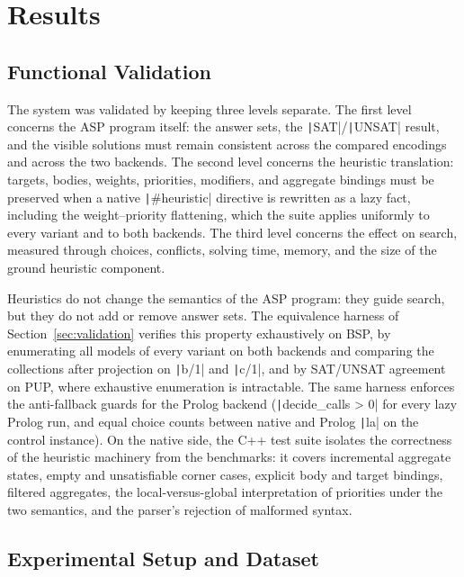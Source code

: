 \section{Results}
\label{sec:results}

\subsection{Functional Validation}

The system was validated by keeping three levels separate. The first level concerns the ASP program itself: the answer sets, the \texttt|SAT|/\texttt|UNSAT| result, and the visible solutions must remain consistent across the compared encodings and across the two backends. The second level concerns the heuristic translation: targets, bodies, weights, priorities, modifiers, and aggregate bindings must be preserved when a native \texttt|#heuristic| directive is rewritten as a lazy fact, including the weight--priority flattening, which the suite applies uniformly to every variant and to both backends. The third level concerns the effect on search, measured through choices, conflicts, solving time, memory, and the size of the ground heuristic component.

Heuristics do not change the semantics of the ASP program: they guide search, but they do not add or remove answer sets. The equivalence harness of Section~\ref{sec:validation} verifies this property exhaustively on BSP, by enumerating all models of every variant on both backends and comparing the collections after projection on \texttt|b/1| and \texttt|c/1|, and by SAT/UNSAT agreement on PUP, where exhaustive enumeration is intractable. The same harness enforces the anti-fallback guards for the Prolog backend (\texttt|decide_calls > 0| for every lazy Prolog run, and equal choice counts between native and Prolog \texttt|la| on the control instance). On the native side, the C++ test suite isolates the correctness of the heuristic machinery from the benchmarks: it covers incremental aggregate states, empty and unsatisfiable corner cases, explicit body and target bindings, filtered aggregates, the local-versus-global interpretation of priorities under the two semantics, and the parser's rejection of malformed syntax.

\subsection{Experimental Setup and Dataset}
\label{sec:dataset}

